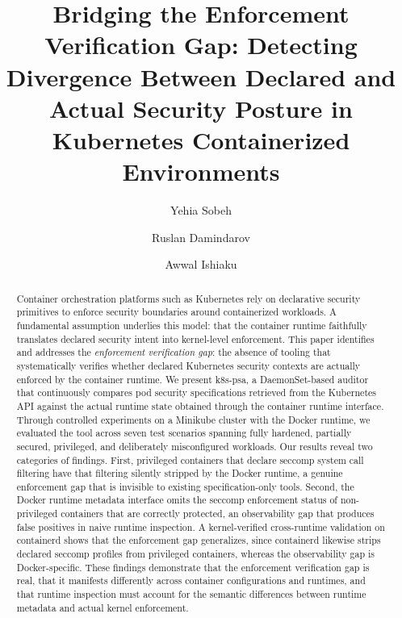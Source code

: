 \documentclass[sigconf]{acmart}
\begin{document}
\title{Bridging the Enforcement Verification Gap: Detecting Divergence Between Declared and Actual Security Posture in Kubernetes Containerized Environments}

\author{Yehia Sobeh}

\author{Ruslan Damindarov}

\author{Awwal Ishiaku}

\begin{abstract}
Container orchestration platforms such as Kubernetes rely on declarative security primitives to enforce security boundaries around containerized workloads. A fundamental assumption underlies this model: that the container runtime faithfully translates declared security intent into kernel-level enforcement. This paper identifies and addresses the \emph{enforcement verification gap}: the absence of tooling that systematically verifies whether declared Kubernetes security contexts are actually enforced by the container runtime. We present k8s-psa, a DaemonSet-based auditor that continuously compares pod security specifications retrieved from the Kubernetes API against the actual runtime state obtained through the container runtime interface. Through controlled experiments on a Minikube cluster with the Docker runtime, we evaluated the tool across seven test scenarios spanning fully hardened, partially secured, privileged, and deliberately misconfigured workloads. Our results reveal two categories of findings. First, privileged containers that declare seccomp system call filtering have that filtering silently stripped by the Docker runtime, a genuine enforcement gap that is invisible to existing specification-only tools. Second, the Docker runtime metadata interface omits the seccomp enforcement status of non-privileged containers that are correctly protected, an observability gap that produces false positives in naive runtime inspection. A kernel-verified cross-runtime validation on containerd shows that the enforcement gap generalizes, since containerd likewise strips declared seccomp profiles from privileged containers, whereas the observability gap is Docker-specific. These findings demonstrate that the enforcement verification gap is real, that it manifests differently across container configurations and runtimes, and that runtime inspection must account for the semantic differences between runtime metadata and actual kernel enforcement.
\end{abstract}
\end{document}
